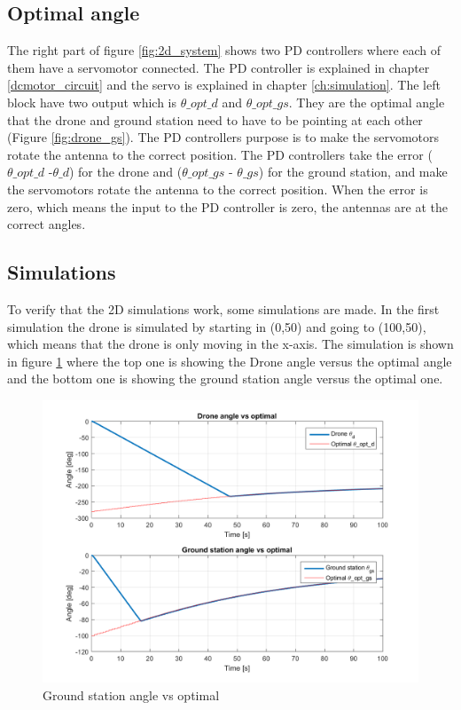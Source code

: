 \subsection{Optimal angle}
The right part of figure \ref{fig:2d_system} shows two PD controllers where each of them have a servomotor connected. The PD controller is explained in chapter \ref{dcmotor_circuit} and the servo is explained in chapter \ref{ch:simulation}. The left block have two output which is $\theta\_opt\_d$ and $\theta\_opt\_gs$. They are the optimal angle that the drone and ground station need to have to be pointing at each other (Figure \ref{fig:drone_gs}). The PD controllers purpose is to make the servomotors rotate the antenna to the correct position. The PD controllers take the error ($\theta\_opt\_d$ -$\theta\_d$) for the drone and ($\theta\_opt\_gs$ - $\theta\_gs$) for the ground station, and make the servomotors rotate the antenna to the correct position. When the error is zero, which means the input to the PD controller is zero, the antennas are at the correct angles.   

\subsection{Simulations}
To verify that the 2D simulations work, some simulations are made. In the first simulation the drone is simulated by starting in (0,50) and going to (100,50), which means that the drone is only moving in the x-axis. The simulation is shown in figure \ref{fig:gs_angle_vs_optimal} where the top one is showing the Drone angle versus the optimal angle and the bottom one is showing the ground station angle versus the optimal one. 

\begin{figure}[h]
	\centering
	\includegraphics[scale=0.6]{figures/gs_angle_vs_optimal.png}
	\caption{Ground station angle vs optimal}
	\label{fig:gs_angle_vs_optimal}
\end{figure}

